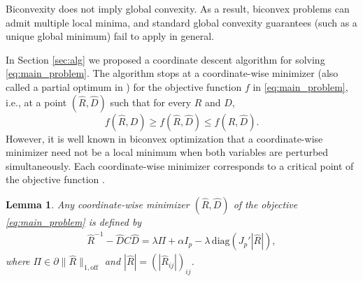 \documentclass[12pt]{amsart}
\numberwithin{equation}{section}
\numberwithin{equation}{section}
\theoremstyle{plain}
\newtheorem{lemma}{Lemma}
\theoremstyle{definition}
\newcommand{\diag}[1]{\mathrm{diag}(#1)}
\begin{document}
Biconvexity does not imply global convexity. As a result, biconvex problems can admit multiple local minima, and standard global convexity guarantees (such as a unique global minimum) fail to apply in general.

In Section \ref{sec:alg} we proposed a coordinate descent algorithm for solving \eqref{eq:main_problem}. 
The algorithm stops at a coordinate-wise minimizer (also called a partial optimum in \cite{biconvex}) for the objective function $f$ in \eqref{eq:main_problem}, i.e., at a point $(\hat{R},\hat{D})$ such that for every $R$ and $D$,
\[
f(\hat{R},D)\geq f(\hat{R},\hat{D}) \leq f(R,\hat{D}).
\] 
However, it is well known in biconvex optimization that a coordinate-wise minimizer need not be a local minimum when both variables are perturbed simultaneously.
Each coordinate-wise minimizer corresponds to a critical point of the objective function \cite[Corollary 4.3]{biconvex}. 


\begin{lemma}\label{lem:charact}
Any coordinate-wise minimizer $(\hat{R},\hat{D})$ of the objective \eqref{eq:main_problem} 
is defined by 
\begin{align}\label{eq:R-DCD}
\hat{R}^{-1}-\hat{D} C \hat{D} =  \lambda\Pi + \alpha I_p  - \lambda\,\diag{J_p' |\hat{R}|},
\end{align}
where $\Pi\in\partial\|\hat{R}\|_{1,\mathrm{off}}$ and $|\hat{R}|=(|\hat{R}_{ij}|)_{ij}$.
\end{lemma}
\end{document}
